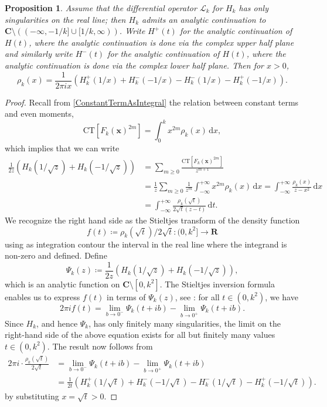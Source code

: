 \documentclass[12pt,reqno]{amsart}
\theoremstyle{definition}
\theoremstyle{plain}
\newtheorem{proposition}[theorem]{Proposition}
\theoremstyle{definition}
\newcommand{\R}{\mathbf{R}}
\newcommand{\Cc}{\mathbf{C}}
\renewcommand{\geq}{\geqslant}
\renewcommand{\d}{\mathrm{d}}
\begin{document}
\begin{proposition} 
Assume that the differential operator $\mathcal L_k$ for $H_k$ has only singularities on the real line; then $H_k$ admits an analytic continuation to $\Cc \setminus ( (-\infty, -1/k] \cup [1/k, \infty ))$.
Write $H^{+}(t)$ for the analytic continuation of $H(t)$, where the analytic continuation is done via the complex \emph{upper} half plane and similarly write $H^{-}(t)$ for the analytic continuation of $H(t)$, where the analytic continuation is done via the complex \emph{lower} half plane. Then 
 for $x > 0$,
\begin{equation}
  \label{pdfidentity}
  \rho_k(x) = \frac{1}{2 \pi i x} \left( H^{+}_k(1/x) + H^{-}_k(-1/x) - H^{-}_k(1/x) - H^{+}_k(-1/x)\right).    
\end{equation}
\end{proposition} 

\begin{proof} 
Recall from \eqref{ConstantTermAsIntegral} the relation between constant terms and even moments, 
\[
\mathrm{CT}[F_k(\mathbf{x})^{2m}] = \int_0^k x^{2m} \rho_k(x) \, \d x,
\]
which implies that we can write 
\begin{align*} 
  \frac{1}{2 z} \left( H_k(1/\sqrt z) + H_k(-1/\sqrt z) \right)  & =     \sum_{m \geq 0} \frac{ \mathrm{CT}[F_k(\mathbf{x})^{2m}]}{z^{m+1}} \\ & 
  = \frac{1}{z}\sum_{m \geq 0} \frac{1}{z^m} \int_{-\infty}^{+\infty} x^{2m} \rho_{k}(x) \, \d x =  \int_{- \infty}^{+\infty} \frac{\rho_k(x)}{z-x^2} \, \d x\\
  &= \int_{- \infty}^{+\infty} \frac{\rho_k(\sqrt{t})}{2\sqrt{t}(z-t)} \, \d t.
\end{align*}
We recognize the right hand side as the Stieltjes transform of the density function $$f(t) \coloneqq  \rho_k(\sqrt{t})/2\sqrt{t}  \colon (0,k^2] \rightarrow \R$$ using as integration contour the interval in the real line where the integrand is non-zero and defined. 
Define 
\[
\Psi_k(z) \coloneqq \frac{1}{2 z} \left( H_k(1/\sqrt z) + H_k(-1/\sqrt z) \right), 
\]
which is an analytic function on $\Cc \setminus [0 , k^2] $.
The Stieltjes inversion formula enables us to express $f(t)$ in terms of $\Psi_k(z)$, see \cite[page 40]{Nica_Speicher_2006}: 
for all $t \in (0, k^2)$, we have
 \[
2 \pi i f(t) = \lim_{b \to 0^{-}} \Psi_k(t+i b) - \lim_{b \to 0^{+}} \Psi_k(t+i b). 
\]
Since $H_k$, and hence $\Psi_k$, has only finitely many singularities, the limit on the right-hand side of the above equation exists for all but finitely many values $t \in (0, k^2)$.
The result now follows from 
\begin{align*}
  2 \pi i \cdot \frac{\rho_k(\sqrt{t})}{2 \sqrt{t}} &=  \lim_{b \to 0^{-}} \Psi_k(t+i b) - \lim_{b \to 0^{+}}  \Psi_k(t+i b) \\
  &= \frac{1}{2 t} \left(H^{+}_k(1/\sqrt{t}) + H^{-}_k(-1/\sqrt{t}) - H^{-}_k(1/\sqrt{t}) - H^{+}_k(-1/\sqrt{t}) \right).
\end{align*}
by substituting $x=\sqrt{t}>0$. 
\end{proof} 
\end{document}
